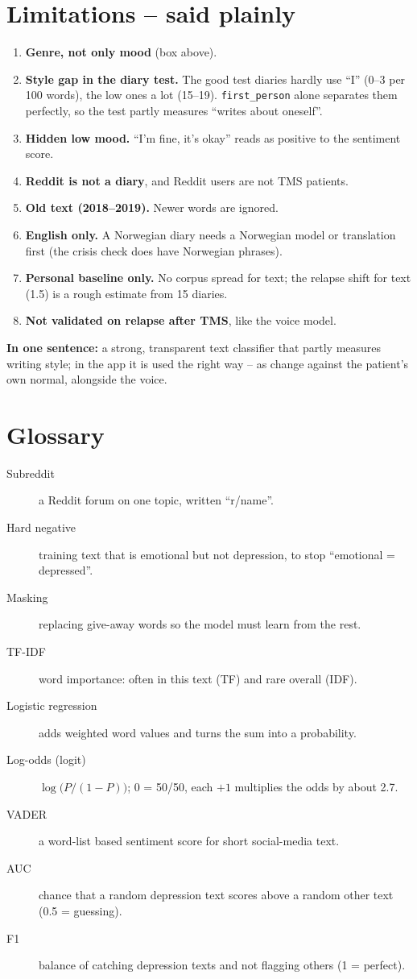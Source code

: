 \documentclass[11pt,a4paper]{article}
\begin{document}
\section{Limitations -- said plainly}
\begin{enumerate}
\item \textbf{Genre, not only mood} (box above).
\item \textbf{Style gap in the diary test.} The good test diaries hardly use ``I'' (0--3 per 100 words),
      the low ones a lot (15--19). \texttt{first\_person} alone separates them perfectly, so the test
      partly measures ``writes about oneself''.
\item \textbf{Hidden low mood.} ``I'm fine, it's okay'' reads as positive to the sentiment score.
\item \textbf{Reddit is not a diary}, and Reddit users are not TMS patients.
\item \textbf{Old text (2018--2019).} Newer words are ignored.
\item \textbf{English only.} A Norwegian diary needs a Norwegian model or translation first (the crisis
      check does have Norwegian phrases).
\item \textbf{Personal baseline only.} No corpus spread for text; the relapse shift for text (1.5) is a
      rough estimate from 15 diaries.
\item \textbf{Not validated on relapse after TMS}, like the voice model.
\end{enumerate}

\textbf{In one sentence:} a strong, transparent text classifier that partly measures writing style; in the
app it is used the right way -- as change against the patient's own normal, alongside the voice.

\section*{Glossary}
\begin{description}
\item[Subreddit] a Reddit forum on one topic, written ``r/name''.
\item[Hard negative] training text that is emotional but not depression, to stop ``emotional = depressed''.
\item[Masking] replacing give-away words so the model must learn from the rest.
\item[TF-IDF] word importance: often in this text (TF) and rare overall (IDF).
\item[Logistic regression] adds weighted word values and turns the sum into a probability.
\item[Log-odds (logit)] $\log\bigl(P/(1-P)\bigr)$; 0 = 50/50, each $+1$ multiplies the odds by about 2.7.
\item[VADER] a word-list based sentiment score for short social-media text.
\item[AUC] chance that a random depression text scores above a random other text (0.5 = guessing).
\item[F1] balance of catching depression texts and not flagging others (1 = perfect).
\end{description}
\end{document}
